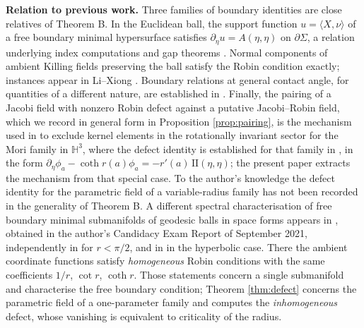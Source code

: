 \documentclass[10pt,a4paper]{amsart}
\newcommand{\Hyp}{\mathbb{H}}
\begin{document}
\medskip
\noindent\textbf{Relation to previous work.} Three families of boundary identities are close relatives of Theorem B. In the Euclidean ball, the support function $u=\langle X,\nu\rangle$ of a free boundary minimal hypersurface satisfies $\partial_\eta u=A(\eta,\eta)$ on $\partial\Sigma$, a relation underlying index computations and gap theorems \cite{FS16,AN16,Dev19,Tra20,SZ19}. Normal components of ambient Killing fields preserving the ball satisfy the Robin condition exactly; instances appear in Li--Xiong \cite[eq. (26)]{LX18}. Boundary relations at general contact angle, for quantities of a different nature, are established in \cite[Lem. 2.9]{NZ1}. Finally, the pairing of a Jacobi field with nonzero Robin defect against a putative Jacobi--Robin field, which we record in general form in Proposition \ref{prop:pairing}, is the mechanism used in \cite{P1} to exclude kernel elements in the rotationally invariant sector for the Mori family in $\Hyp^3$, where the defect identity is established for that family in \cite[Lem. 8.3]{P1}, in the form $\partial_\eta\phi_a-\coth r(a)\phi_a=-r'(a)\,\mathrm{II}(\eta,\eta)$; the present paper extracts the mechanism from that special case. To the author's knowledge the defect identity for the parametric field of a variable-radius family has not been recorded in the generality of Theorem B.
A different spectral characterisation of free boundary minimal submanifolds of geodesic balls in space forms appears in \cite[Prop.~2.6, Thms.~2.7--2.8]{dO-thesis}, obtained in the author's Candidacy Exam Report of September 2021, independently in \cite[Prop.~1]{LM23} for $r<\pi/2$, and in \cite[Prop.~2.1]{Med23} in the hyperbolic case. There the ambient coordinate functions satisfy \emph{homogeneous} Robin conditions with the same coefficients $1/r$, $\cot r$, $\coth r$. Those statements concern a single submanifold and characterise the free boundary condition; Theorem \ref{thm:defect} concerns the parametric field of a one-parameter family and computes the \emph{inhomogeneous} defect, whose vanishing is equivalent to criticality of the radius.
\end{document}
